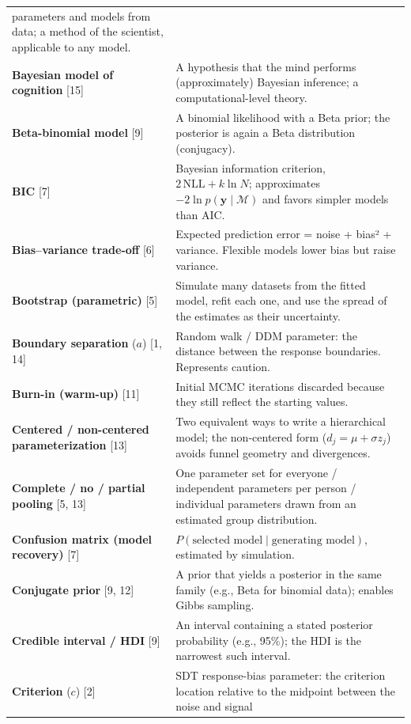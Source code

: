 \begin{longtable}[]{@{}
  >{\raggedright\arraybackslash}p{}
  >{\raggedright\arraybackslash}p{}@{}}
parameters and models from data; a method of the scientist, applicable
to any model. \\
\textbf{Bayesian model of cognition} {[}15{]} & A hypothesis that the
mind performs (approximately) Bayesian inference; a computational-level
theory. \\
\textbf{Beta-binomial model} {[}9{]} & A binomial likelihood with a Beta
prior; the posterior is again a Beta distribution (conjugacy). \\
\textbf{BIC} {[}7{]} & Bayesian information criterion,
\(2\,\mathrm{NLL} + k\ln N\); approximates
\(-2\ln p(\mathbf{y}\mid\mathcal{M})\) and favors simpler models than
AIC. \\
\textbf{Bias--variance trade-off} {[}6{]} & Expected prediction error =
noise + bias² + variance. Flexible models lower bias but raise
variance. \\
\textbf{Bootstrap (parametric)} {[}5{]} & Simulate many datasets from
the fitted model, refit each one, and use the spread of the estimates as
their uncertainty. \\
\textbf{Boundary separation} (\(a\)) {[}1, 14{]} & Random walk / DDM
parameter: the distance between the response boundaries. Represents
caution. \\
\textbf{Burn-in (warm-up)} {[}11{]} & Initial MCMC iterations discarded
because they still reflect the starting values. \\
\textbf{Centered / non-centered parameterization} {[}13{]} & Two
equivalent ways to write a hierarchical model; the non-centered form
(\(d_j = \mu + \sigma z_j\)) avoids funnel geometry and divergences. \\
\textbf{Complete / no / partial pooling} {[}5, 13{]} & One parameter set
for everyone / independent parameters per person / individual parameters
drawn from an estimated group distribution. \\
\textbf{Confusion matrix (model recovery)} {[}7{]} &
\(P(\text{selected model} \mid \text{generating model})\), estimated by
simulation. \\
\textbf{Conjugate prior} {[}9, 12{]} & A prior that yields a posterior
in the same family (e.g., Beta for binomial data); enables Gibbs
sampling. \\
\textbf{Credible interval / HDI} {[}9{]} & An interval containing a
stated posterior probability (e.g., 95\%); the HDI is the narrowest such
interval. \\
\textbf{Criterion} (\(c\)) {[}2{]} & SDT response-bias parameter: the
criterion location relative to the midpoint between the noise and signal

\end{longtable}
